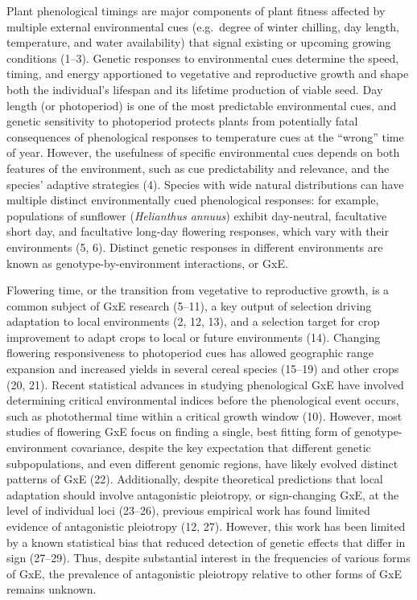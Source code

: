 \documentclass[
  9pt,
  twocolumn,
  twoside]{pnas-new}
\begin{document}
Plant phenological timings are major components of plant fitness
affected by multiple external environmental cues (e.g.~degree of winter
chilling, day length, temperature, and water availability) that signal
existing or upcoming growing conditions (1--3). Genetic responses to
environmental cues determine the speed, timing, and energy apportioned
to vegetative and reproductive growth and shape both the individual's
lifespan and its lifetime production of viable seed. Day length (or
photoperiod) is one of the most predictable environmental cues, and
genetic sensitivity to photoperiod protects plants from potentially
fatal consequences of phenological responses to temperature cues at the
``wrong'' time of year. However, the usefulness of specific
environmental cues depends on both features of the environment, such as
cue predictability and relevance, and the species' adaptive strategies
(4). Species with wide natural distributions can have multiple distinct
environmentally cued phenological responses: for example, populations of
sunflower (\emph{Helianthus annuus}) exhibit day-neutral, facultative
short day, and facultative long-day flowering responses, which vary with
their environments (5, 6). Distinct genetic responses in different
environments are known as genotype-by-environment interactions, or GxE.

Flowering time, or the transition from vegetative to reproductive
growth, is a common subject of GxE research (5--11), a key output of
selection driving adaptation to local environments (2, 12, 13), and a
selection target for crop improvement to adapt crops to local or future
environments (14). Changing flowering responsiveness to photoperiod cues
has allowed geographic range expansion and increased yields in several
cereal species (15--19) and other crops (20, 21). Recent statistical
advances in studying phenological GxE have involved determining critical
environmental indices before the phenological event occurs, such as
photothermal time within a critical growth window (10). However, most
studies of flowering GxE focus on finding a single, best fitting form of
genotype-environment covariance, despite the key expectation that
different genetic subpopulations, and even different genomic regions,
have likely evolved distinct patterns of GxE (22). Additionally, despite
theoretical predictions that local adaptation should involve
antagonistic pleiotropy, or sign-changing GxE, at the level of
individual loci (23--26), previous empirical work has found limited
evidence of antagonistic pleiotropy (12, 27). However, this work has
been limited by a known statistical bias that reduced detection of
genetic effects that differ in sign (27--29). Thus, despite substantial
interest in the frequencies of various forms of GxE, the prevalence of
antagonistic pleiotropy relative to other forms of GxE remains unknown.
\end{document}
